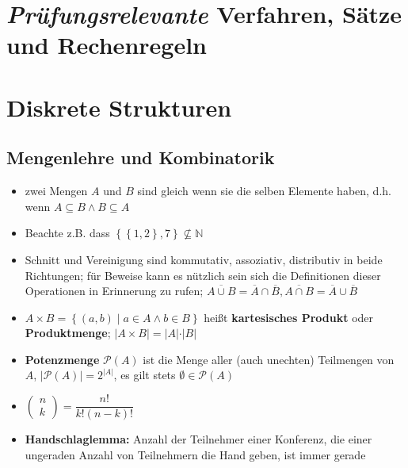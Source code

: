 \documentclass[10pt,a4paper]{article}
\begin{document}
\section*{\textit{Prüfungsrelevante} Verfahren, Sätze und Rechenregeln}
\section{Diskrete Strukturen}
\subsection{Mengenlehre und Kombinatorik}
\begin{itemize}
\item zwei Mengen $A$ und $B$ sind gleich wenn sie die selben Elemente haben, d.h. wenn $A \subseteq B \land B \subseteq A$
\item Beachte z.B. dass $\left\lbrace\left\lbrace 1,2\right\rbrace, 7\right\rbrace \nsubseteq \mathbb{N}$
\item Schnitt und Vereinigung sind kommutativ, assoziativ, distributiv in beide Richtungen; für Beweise kann es nützlich sein sich die Definitionen dieser Operationen in Erinnerung zu rufen; $\overline{A\cup B}=\overline{A}\cap \overline{B}, \overline{A\cap B}=\overline{A}\cup \overline{B}$
\item $A\times B=\left\lbrace (a,b)\mid a\in A \land b\in B\right\rbrace$ heißt \textbf{kartesisches Produkt} oder \textbf{Produktmenge};  $\vert A\times B\vert =\vert A\vert \cdot \vert B\vert$
\item \textbf{Potenzmenge} $\mathcal{P}(A)$ ist die Menge aller (auch unechten) Teilmengen von $A$, $\vert \mathcal{P}(A)\vert =2^{\vert A\vert}$, es gilt stets $\emptyset \in \mathcal{P}(A)$
\item $\begin{pmatrix} n\\ k\end{pmatrix}=\dfrac{n!}{k!(n-k)!}$
\item \textbf{Handschlaglemma:} Anzahl der Teilnehmer einer Konferenz, die einer ungeraden Anzahl von Teilnehmern die Hand geben, ist immer gerade


\end{itemize}
\end{document}
